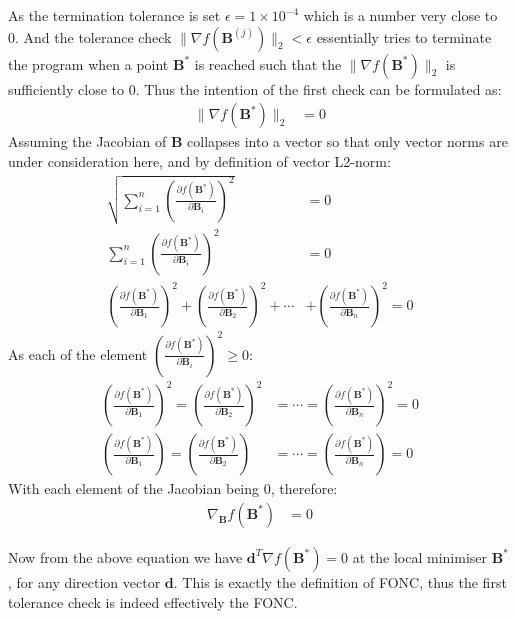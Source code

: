 \documentclass[12pt]{article}
\numberwithin{equation}{section}
\theoremstyle{remark}
\newcommand{\vect}[1]{\boldsymbol{#1}}
\newcommand{\norm}[2]{\|#1\|_{#2}}
\begin{document}
As the termination tolerance is set $\epsilon = 1 \times 10^{-4}$ which is a number very close to 0. And the tolerance check $\norm{\nabla f(\vect{B}^{(j)})}{2} < \epsilon$ essentially tries to terminate the program when a point $\vect{B}^{*}$ is reached such that the $\norm{\nabla f(\vect{B}^{*})}{2}$ is sufficiently close to 0. Thus the intention of the first check can be formulated as:
\begin{align}
\norm{\nabla f(\vect{B}^{*})}{2} &= 0
\end{align}
Assuming the Jacobian of $\vect{B}$ collapses into a vector so that only vector norms are under consideration here, and by definition of vector L2-norm:
\begin{align}
\sqrt{\sum\limits_{i = 1}^{n}\left(\frac{
\partial f\left(\vect{B}^{*}\right)}{\partial \vect{B}_{i}}\right)^{2}} &= 0 \\
\sum\limits_{i = 1}^{n}\left(\frac{
\partial f\left(\vect{B}^{*}\right)}{\partial \vect{B}_{i}}\right)^{2} &= 0 \\
\left(\frac{
\partial f\left(\vect{B}^{*}\right)}{\partial \vect{B}_{1}}\right)^{2} + \left(\frac{
\partial f\left(\vect{B}^{*}\right)}{\partial \vect{B}_{2}}\right)^{2} + \cdots &+
\left(\frac{
\partial f\left(\vect{B}^{*}\right)}{\partial \vect{B}_{n}}\right)^{2} = 0
\end{align}
As each of the element $\left(\frac{\partial f\left(\vect{B}^{*}\right)}{\partial \vect{B}_{i}}\right)^{2} \geq 0$:
\begin{align}
\left(\frac{\partial f\left(\vect{B}^{*}\right)}{\partial \vect{B}_{1}}\right)^{2} = \left(\frac{\partial f\left(\vect{B}^{*}\right)}{\partial \vect{B}_{2}}\right)^{2} &= \cdots = \left(\frac{\partial f\left(\vect{B}^{*}\right)}{\partial \vect{B}_{n}}\right)^{2} = 0 \\
\left(\frac{\partial f\left(\vect{B}^{*}\right)}{\partial \vect{B}_{1}}\right) = \left(\frac{\partial f\left(\vect{B}^{*}\right)}{\partial \vect{B}_{2}}\right) &= \cdots = \left(\frac{\partial f\left(\vect{B}^{*}\right)}{\partial \vect{B}_{n}}\right) = 0
\end{align}
With each element of the Jacobian being 0, therefore:
\begin{align}
\nabla_{\vect{B}} f(\vect{B}^{*}) &= 0
\end{align}

\medskip
Now from the above equation we have $\vect{d}^{T}\nabla f(\vect{B}^{*}) = 0$ at the local minimiser $\vect{B}^{*}$, for any direction vector $\vect{d}$. This is exactly the definition of FONC, thus the first tolerance check is indeed effectively the FONC.
\end{document}
